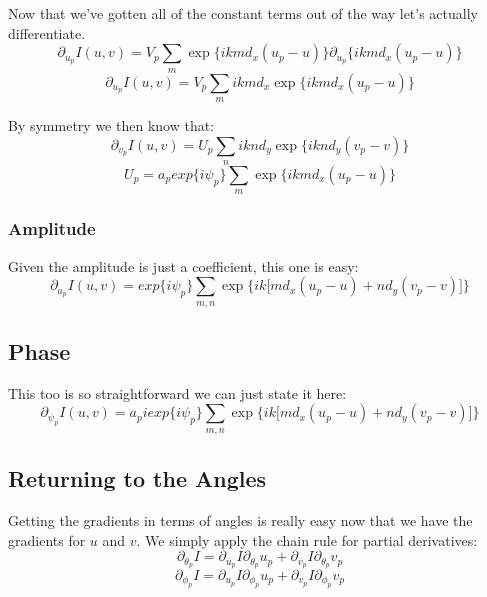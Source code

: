 \documentclass[12pt,a6paper]{book}
\begin{document}
Now that we've gotten all of the constant terms out of the way let's actually differentiate.
\begin{equation}
\partial_{u_p}I(u, v) =V_p\sum_{m}\exp\lbrace ikmd_x(u_p-u)\rbrace \partial_{u_p}\lbrace ikmd_x(u_p-u) \rbrace
\end{equation}
\begin{equation}
\partial_{u_p}I(u, v) =V_p\sum_{m}ikmd_x\exp\lbrace ikmd_x(u_p-u)\rbrace
\end{equation}

By symmetry we then know that:
\begin{equation}
\partial_{v_p}I(u, v) =U_p\sum_{n}iknd_y\exp\lbrace iknd_y(v_p-v)\rbrace
\end{equation}
\begin{equation}
U_p = a_p exp\lbrace i\psi_p \rbrace \sum_{m} \exp\lbrace ikmd_x(u_p-u)\rbrace
\end{equation}

\subsubsection{Amplitude}
Given the amplitude is just a coefficient, this one is easy:
\begin{equation}
\partial_{a_p}I(u, v) =  exp\lbrace i\psi_p \rbrace \sum_{m,n}\exp\lbrace ik \lbrack md_x(u_p-u)+nd_y(v_p-v)\rbrack\rbrace 
\end{equation}

\subsection{Phase}
This too is so straightforward we can just state it here:
\begin{equation}
\partial_{\psi_p}I(u, v) =  a_p iexp\lbrace i\psi_p \rbrace \sum_{m,n}\exp\lbrace ik \lbrack md_x(u_p-u)+nd_y(v_p-v)\rbrack\rbrace 
\end{equation}

\subsection{Returning to the Angles}
Getting the gradients in terms of angles is really easy now that we have the gradients for $u$ and $v$. We simply apply the chain rule for partial derivatives:
\begin{equation}
\partial_{\theta_p}I = \partial_{u_p}I \partial_{\theta_p}u_p + \partial_{v_p}I \partial_{\theta_p}v_p
\end{equation}
\begin{equation}
\partial_{\phi_p}I = \partial_{u_p}I \partial_{\phi_p}u_p + \partial_{v_p}I \partial_{\phi_p}v_p
\end{equation}
\end{document}
